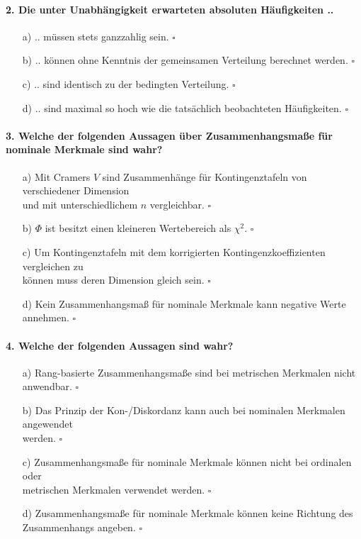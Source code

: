 \documentclass[a4paper]{article}
\begin{document}
\paragraph{2. Die unter Unabhängigkeit erwarteten absoluten Häufigkeiten ..}

\begin{itemize}
    \item[a)] .. müssen stets ganzzahlig sein. \hfill $\square$
    \item[b)] .. können ohne Kenntnis der gemeinsamen Verteilung berechnet werden. \hfill $\square$
    \item[c)] .. sind identisch zu der bedingten Verteilung. \hfill $\square$
    \item[d)] .. sind maximal so hoch wie die tatsächlich beobachteten Häufigkeiten. \hfill $\square$
\end{itemize}

\paragraph{3. Welche der folgenden Aussagen über Zusammenhangsmaße für nominale Merkmale sind wahr?}

\begin{itemize}
    \item[a)] Mit Cramers $V$ sind Zusammenhänge für Kontingenztafeln von verschiedener Dimension\\und mit unterschiedlichem $n$ vergleichbar. \hfill $\square$
    \item[b)] $\Phi$ ist besitzt einen kleineren Wertebereich als $\chi^2$. \hfill $\square$
    \item[c)] Um Kontingenztafeln mit dem korrigierten Kontingenzkoeffizienten vergleichen zu\\können muss deren Dimension gleich sein. \hfill $\square$
    \item[d)] Kein Zusammenhangsmaß für nominale Merkmale kann negative Werte annehmen. \hfill $\square$
\end{itemize}

\paragraph{4. Welche der folgenden Aussagen sind wahr?}

\begin{itemize}
    \item[a)] Rang-basierte Zusammenhangsmaße sind bei metrischen Merkmalen nicht anwendbar. \hfill $\square$
    \item[b)] Das Prinzip der Kon-/Diskordanz kann auch bei nominalen Merkmalen angewendet\\werden. \hfill $\square$
    \item[c)] Zusammenhangsmaße für nominale Merkmale können nicht bei ordinalen oder\\metrischen Merkmalen verwendet werden. \hfill $\square$
    \item[d)] Zusammenhangsmaße für nominale Merkmale können keine Richtung des\\Zusammenhangs angeben. \hfill $\square$
\end{itemize}
\end{document}
